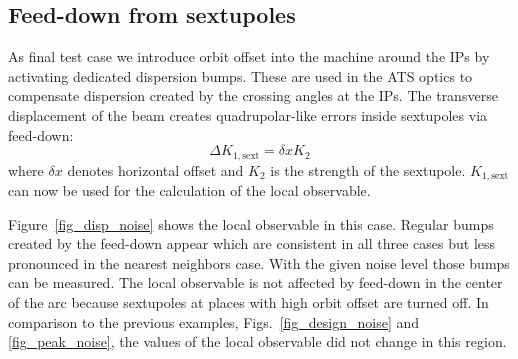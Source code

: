 \subsection{Feed-down from sextupoles}

As final test case we introduce orbit offset into the machine around the IPs by activating dedicated dispersion
bumps. These are used in the ATS optics to compensate dispersion created by the crossing angles at the IPs.
The transverse displacement of the beam creates quadrupolar-like errors inside sextupoles via feed-down:
%
\begin{equation}
  \Delta K_{1,\text{sext}} = \delta x K_2
  \label{eq_sext_fedddown}
\end{equation}
%
where $\delta x$ denotes horizontal offset and $K_2$ is the strength of the sextupole. $K_{1,\text{sext}}$
can now be used for the calculation of the local observable.



Figure~\ref{fig_disp_noise} shows the local observable in this case. Regular bumps created by the
feed-down appear which are consistent in all three cases but less pronounced in the nearest neighbors case.
With the given noise level those bumps can be measured.
The local observable is not affected by feed-down in the center of the arc because sextupoles at places
with high orbit offset are turned off.
In comparison to the previous examples, Figs.~\ref{fig_design_noise} and \ref{fig_peak_noise}, the
values of the local observable did not change in this region.

